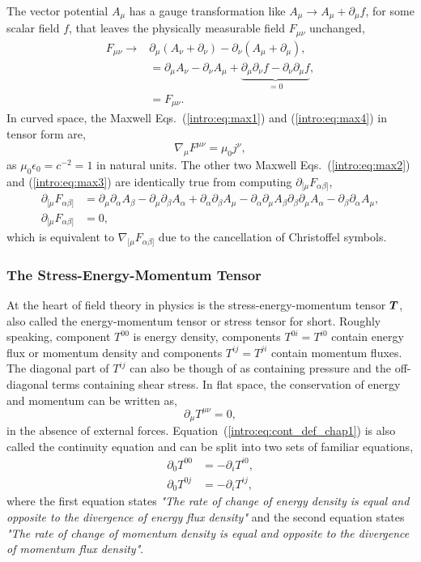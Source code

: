 The vector potential $A_\mu$ has a gauge transformation like $A_\mu \rightarrow A_\mu + \partial_\mu f$, for some scalar field $f$, that leaves the physically measurable field $F_{\mu\nu}$ unchanged,
\begin{align}
F_{\mu\nu} \rightarrow &\partial_{\mu} (A_\nu + \partial_\nu) -  \partial_{\nu} (A_\mu + \partial_\mu) ,\\
&= \partial_{\mu} A_\nu - \partial_{\nu} A_\mu + \underbrace{\partial_\mu\partial_\nu f - \partial_\nu \partial_\mu f}_{=0} , \\
&= F_{\mu\nu}.
\end{align}
In curved space, the Maxwell Eqs.~(\ref{intro:eq:max1}) and (\ref{intro:eq:max4}) in tensor form are,
\begin{equation}
\nabla_\mu F^{\mu\nu} = \mu_0 j^\nu,
\end{equation}
as $\mu_0 \epsilon_0 = c^{-2} = 1$ in natural units. The other two Maxwell Eqs.~(\ref{intro:eq:max2}) and (\ref{intro:eq:max3}) are identically true from computing $\partial_{[\mu} F_{\alpha\beta]}$,
\begin{align}
\partial_{[\mu} F_{\alpha\beta]} &= \partial_\mu\partial_\alpha A_\beta - \partial_\mu\partial_\beta A_\alpha
+\partial_\alpha\partial_\beta A_\mu - \partial_\alpha\partial_\mu A_\beta
\partial_\beta\partial_\mu A_\alpha - \partial_\beta\partial_\alpha A_\mu ,\\\partial_{[\mu} F_{\alpha\beta]} &=0,
\end{align}
which is equivalent to $\nabla_{[\mu}F_{\alpha\beta]}$ due to the cancellation of Christoffel symbols.



\subsubsection{The Stress-Energy-Momentum Tensor}
At the heart of field theory in physics is the stress-energy-momentum tensor $\boldsymbol{T}$, also called the energy-momentum tensor or stress tensor for short. Roughly speaking, component $T^{00}$ is energy density, components $T^{0i}=T^{i0}$ contain energy flux or momentum density and components $T^{ij}=T^{ji}$ contain momentum fluxes. The diagonal part of $T^{ij}$ can also be though of as containing pressure and the off-diagonal terms containing shear stress. In flat space, the conservation of energy and momentum can be written as, 
\begin{equation}
\partial_\mu T^{\mu\nu} =0,\label{intro:eq:cont_def_chap1}
\end{equation}
in the absence of external forces. Equation~(\ref{intro:eq:cont_def_chap1}) is also called the continuity equation and can be split into two sets of familiar equations,
\begin{align}
\partial_0 T^{00} &= - \partial_i T^{i0}, \\
\partial_0 T^{0j} &= - \partial_i T^{ij},
\end{align}
where the first equation states {\it "The rate of change of energy density is equal and opposite to the divergence of energy flux density"} and the second equation states {\it "The rate of change of momentum density is equal and opposite to the divergence of momentum flux density"}. 

